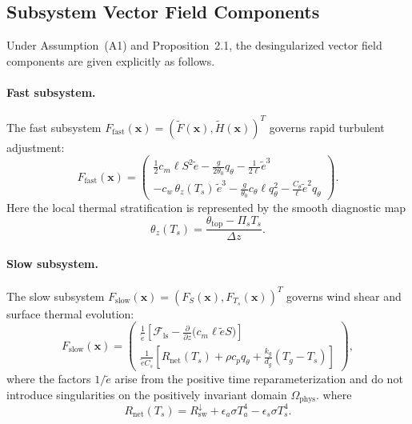 \subsection{Subsystem Vector Field Components}

Under Assumption~(A1) and Proposition~2.1, the desingularized vector field components are given explicitly as follows.

\paragraph{Fast subsystem.}
The fast subsystem $F_{\mathrm{fast}}(\mathbf{x}) = (\tilde F(\mathbf{x}), \tilde H(\mathbf{x}))^T$ governs rapid turbulent adjustment:
\begin{equation}
F_{\mathrm{fast}}(\mathbf{x})
= \begin{pmatrix}
\frac{1}{2} c_m \ell S^2 \tilde e - \frac{g}{2\theta_0} q_\theta - \frac{1}{2\ell} \tilde e^3 \\
- c_w \, \theta_z(T_s) \, \tilde e^3 - \frac{g}{\theta_0} c_\theta \ell q_\theta^2 - \frac{C_\theta}{\ell} \tilde e^2 q_\theta
\end{pmatrix}.
\end{equation}
Here the local thermal stratification is represented by the smooth diagnostic map
\begin{equation}
\theta_z(T_s) = \frac{\theta_{\mathrm{top}} - \Pi_s T_s}{\Delta z}.
\end{equation}

\paragraph{Slow subsystem.}
The slow subsystem $F_{\mathrm{slow}}(\mathbf{x}) = (F_S(\mathbf{x}), F_{T_s}(\mathbf{x}))^T$ governs wind shear and surface thermal evolution:
\begin{equation}
F_{\mathrm{slow}}(\mathbf{x})
= \begin{pmatrix}
\frac{1}{\tilde e}\left[\mathcal{F}_{\mathrm{ls}} - \frac{\partial}{\partial z}\big(c_m \ell \tilde e S\big)\right] \\
\frac{1}{\tilde e C_s}\left[R_{\mathrm{net}}(T_s) + \rho c_p q_\theta + \frac{k_g}{d_g}(T_g - T_s)\right]
\end{pmatrix},
\end{equation}
where the factors $1/\tilde e$ arise from the positive time reparameterization and do not introduce singularities on the positively invariant domain $\Omega_{\mathrm{phys}}$.
where
\begin{equation}
R_{\mathrm{net}}(T_s)
= R_{\mathrm{sw}}^{\downarrow} + \epsilon_a \sigma T_a^4 - \epsilon_s \sigma T_s^4.
\end{equation}

